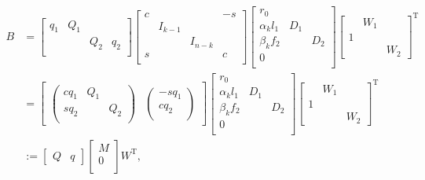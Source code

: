 \documentclass[12pt]{article}
\newcommand{\op}{\operatorname}
\begin{document}
\[
    \begin{aligned}
        B &= \begin{bmatrix}
            q_1 & Q_1 \\
            & & Q_2 & q_2 \\
        \end{bmatrix}
        \begin{bmatrix}
            c & & & -s \\
            & I_{k-1} \\
            & & I_{n - k} \\
            s & & & c \\
        \end{bmatrix}
        \begin{bmatrix}
            r_0 \\
            \alpha_k l_1 & D_1 \\
            \beta_k f_2 &  & D_2 \\
            0 \\
        \end{bmatrix}
        \begin{bmatrix}
            & W_1 \\
            1 \\
            & & W_2
        \end{bmatrix}^{\op T} \\
        &= \begin{bmatrix}
            \begin{pmatrix}
                c q_1 & Q_1 \\
                s q_2 & & Q_2 \\
            \end{pmatrix}
            & \begin{pmatrix}
                -s q_1 \\
                c q_2 \\
            \end{pmatrix}
        \end{bmatrix}
        \begin{bmatrix}
            r_0 \\
            \alpha_k l_1 & D_1 \\
            \beta_k f_2 &  & D_2 \\
            0 \\
        \end{bmatrix}
        \begin{bmatrix}
            & W_1 \\
            1 \\
            & & W_2
        \end{bmatrix}^{\op T} \\
        &:= \begin{bmatrix}
            Q & q
        \end{bmatrix}
        \begin{bmatrix}
            M \\
            0 \\
        \end{bmatrix}
        W^{\op T},
    \end{aligned}
\]
\end{document}
